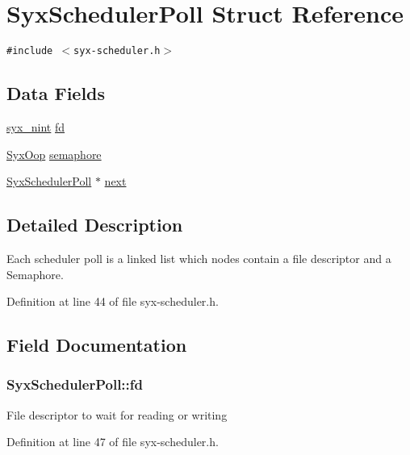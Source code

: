 \hypertarget{struct_syx_scheduler_poll}{
\section{SyxSchedulerPoll Struct Reference}
\label{struct_syx_scheduler_poll}
}
{\tt \#include $<$syx-scheduler.h$>$}

\subsection*{Data Fields}
\begin{CompactItemize}
\item 
\hyperlink{syx-types_8h_488ad2504ade19c761a3e2a1726b4781}{syx\_\-nint} \hyperlink{struct_syx_scheduler_poll_6d209958f2d43ab3f79dc8959c220d7b}{fd}
\item 
\hyperlink{syx-types_8h_1121caba2d40b2ce090b640762744ccd}{SyxOop} \hyperlink{struct_syx_scheduler_poll_29351d80c985a867917f0d81ec6a790f}{semaphore}
\item 
\hyperlink{struct_syx_scheduler_poll}{SyxSchedulerPoll} $\ast$ \hyperlink{struct_syx_scheduler_poll_805f9e5a3c5ceefc63f8d054129deb55}{next}
\end{CompactItemize}


\subsection{Detailed Description}
Each scheduler poll is a linked list which nodes contain a file descriptor and a Semaphore. 

Definition at line 44 of file syx-scheduler.h.

\subsection{Field Documentation}
\hypertarget{struct_syx_scheduler_poll_6d209958f2d43ab3f79dc8959c220d7b}{
\subsubsection{ {\bf SyxSchedulerPoll::fd}}}
\label{struct_syx_scheduler_poll_6d209958f2d43ab3f79dc8959c220d7b}


File descriptor to wait for reading or writing 

Definition at line 47 of file syx-scheduler.h.

